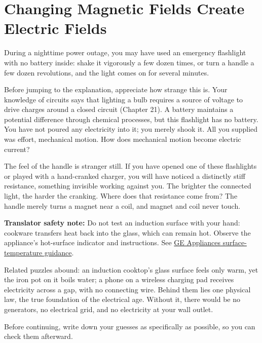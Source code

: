 \chapter{Changing Magnetic Fields Create Electric Fields}


During a nighttime power outage, you may have used an emergency flashlight with no battery inside: shake it vigorously a few dozen times, or turn a handle a few dozen revolutions, and the light comes on for several minutes.

Before jumping to the explanation, appreciate how strange this is. Your knowledge of circuits says that lighting a bulb requires a source of voltage to drive charges around a closed circuit (Chapter 21). A battery maintains a potential difference through chemical processes, but this flashlight has no battery. You have not poured any electricity into it; you merely shook it. All you supplied was effort, mechanical motion. How does mechanical motion become electric current?

The feel of the handle is stranger still. If you have opened one of these flashlights or played with a hand-cranked charger, you will have noticed a distinctly stiff resistance, something invisible working against you. The brighter the connected light, the harder the cranking. Where does that resistance come from? The handle merely turns a magnet near a coil, and magnet and coil never touch.

\textbf{Translator safety note:} Do not test an induction surface with your hand: cookware transfers heat back into the glass, which can remain hot. Observe the appliance's hot-surface indicator and instructions. See \href{https://products.geappliances.com/appliance/gea-support-search-content?contentId=000062465}{GE Appliances surface-temperature guidance}.

Related puzzles abound: an induction cooktop's glass surface feels only warm, yet the iron pot on it boils water; a phone on a wireless charging pad receives electricity across a gap, with no connecting wire. Behind them lies one physical law, the true foundation of the electrical age. Without it, there would be no generators, no electrical grid, and no electricity at your wall outlet.


Before continuing, write down your guesses as specifically as possible, so you can check them afterward.

